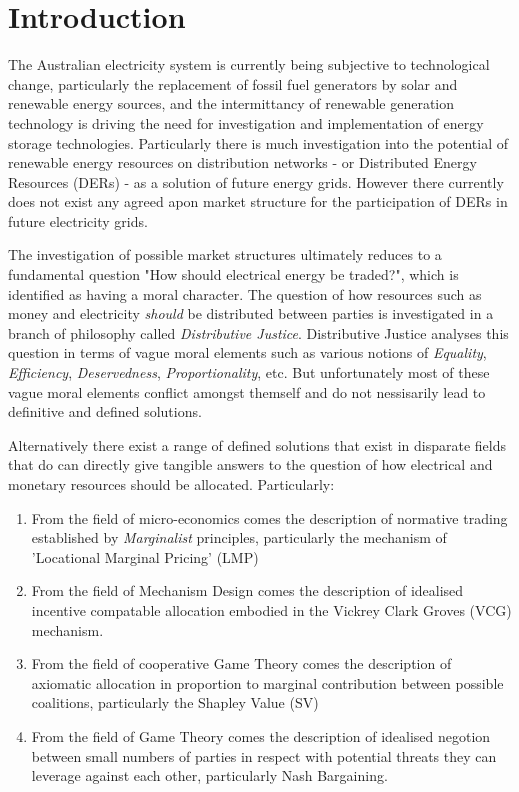 \documentclass[
10pt, %
a4paper, %
oneside, %
headinclude,footinclude, %
BCOR5mm, %
]{scrartcl}
\begin{document}
\section{Introduction}

The Australian electricity system is currently being subjective to technological change, particularly the replacement of fossil fuel generators by solar and renewable energy sources, and the intermittancy of renewable generation technology is driving the need for investigation and implementation of energy storage technologies.
Particularly there is much investigation into the potential of renewable energy resources on distribution networks - or Distributed Energy Resources (DERs) - as a solution of future energy grids.
However there currently does not exist any agreed apon market structure for the participation of DERs in future electricity grids.

The investigation of possible market structures ultimately reduces to a fundamental question "How should electrical energy be traded?", which is identified as having a moral character.
The question of how resources such as money and electricity \textit{should} be distributed between parties is investigated in a branch of philosophy called \textit{Distributive Justice}.
Distributive Justice analyses this question in terms of vague moral elements such as various notions of \textit{Equality}, \textit{Efficiency}, \textit{Deservedness}, \textit{Proportionality}, etc.
But unfortunately most of these vague moral elements conflict amongst themself and do not nessisarily lead to definitive and defined solutions.

Alternatively there exist a range of defined solutions that exist in disparate fields that do can directly give tangible answers to the question of how electrical and monetary resources should be allocated. Particularly:
\begin{enumerate}[noitemsep]
\item From the field of micro-economics comes the description of normative trading established by \textit{Marginalist} principles, particularly the mechanism of 'Locational Marginal Pricing' (LMP)
\item From the field of Mechanism Design comes the description of idealised incentive compatable allocation embodied in the Vickrey Clark Groves (VCG) mechanism.
\item From the field of cooperative Game Theory comes the description of axiomatic allocation in proportion to marginal contribution between possible coalitions, particularly the Shapley Value (SV)
\item From the field of Game Theory comes the description of idealised negotion between small numbers of parties in respect with potential threats they can leverage against each other, particularly Nash Bargaining.
\end{enumerate}
\end{document}
